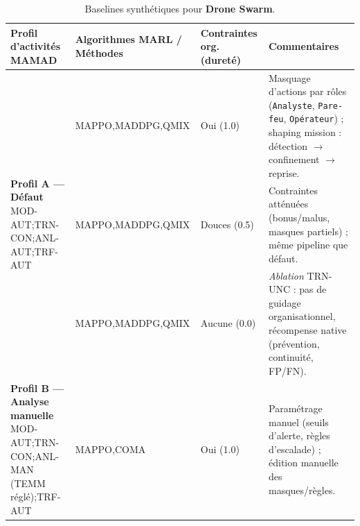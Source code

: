 \begin{table}[h!]
  \centering
  \caption{Baselines synthétiques pour \textbf{Drone Swarm}.}
  \label{tab:baselines_drone_swarm}
  \renewcommand{\arraystretch}{1.2}
  \tiny
  \begin{tabularx}{\textwidth}{p{3.8cm}p{3.2cm}p{2.8cm}p{4.5cm}}
    \toprule
    \textbf{Profil d'activités MAMAD} & \textbf{Algorithmes MARL / Méthodes}             & \textbf{Contraintes org. (dureté)} & \textbf{Commentaires}                                                                                                                                                  \\
    \midrule
    \multirow{3}{*}{\parbox{3.8cm}{\textbf{Profil A — Défaut}                                                                                                                                                                                                                                          \\MOD-AUT;\;TRN-CON;\;ANL-AUT;\;TRF-AUT}}
                                      & MAPPO,\;MADDPG,\;QMIX                            & Oui (1.0)                          & Masquage d’actions par rôles (\texttt{Analyste}, \texttt{Pare-feu}, \texttt{Opérateur}) ; shaping mission : détection $\rightarrow$ confinement $\rightarrow$ reprise. \\
                                      & MAPPO,\;MADDPG,\;QMIX                            & Douces (0.5)                       & Contraintes atténuées (bonus/malus, masques partiels) ; même pipeline que défaut.                                                                                      \\
                                      & MAPPO,\;MADDPG,\;QMIX                            & Aucune (0.0)                       & \textit{Ablation} TRN-UNC : pas de guidage organisationnel, récompense native (prévention, continuité, FP/FN).                                                         \\
    \midrule
    \multirow{3}{*}{\parbox{3.8cm}{\textbf{Profil B — Analyse manuelle}                                                                                                                                                                                                                                \\MOD-AUT;\;TRN-CON;\;ANL-MAN (TEMM réglé);\;TRF-AUT}}
                                      & MAPPO,\;COMA                                     & Oui (1.0)                          & Paramétrage manuel (seuils d’alerte, règles d’escalade) ; édition manuelle des masques/règles.                                                                         \\

\end{tabularx}
\end{table}
